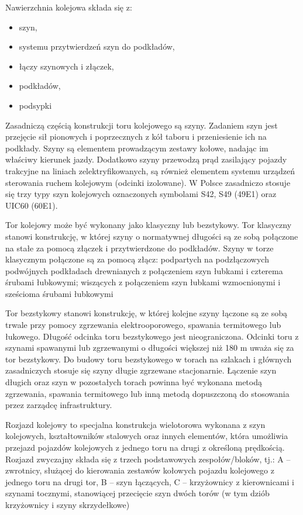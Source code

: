 Nawierzchnia kolejowa składa się z:
\begin{itemize}
\item szyn,
\item systemu przytwierdzeń szyn do podkładów,
\item łączy szynowych i złączek,
\item podkładów,
\item podsypki 
\end{itemize}


Zasadniczą częścią konstrukcji toru kolejowego są szyny. Zadaniem szyn jest przejęcie sił pionowych i poprzecznych z kół taboru i przeniesienie ich na podkłady. Szyny są elementem prowadzącym zestawy kołowe, nadając im właściwy kierunek jazdy. Dodatkowo szyny przewodzą prąd zasilający pojazdy trakcyjne na liniach zelektryfikowanych, są również elementem systemu urządzeń sterowania ruchem kolejowym (odcinki izolowane). W Polsce zasadniczo stosuje się trzy typy szyn kolejowych oznaczonych symbolami S42, S49 (49E1)
oraz UIC60 (60E1).

Tor kolejowy może być wykonany jako klasyczny lub bezstykowy. Tor klasyczny stanowi konstrukcję, w której szyny o normatywnej długości są ze sobą połączone na stałe za pomocą złączek i przytwierdzone do podkładów. Szyny w torze klasycznym połączone są za pomocą złącz:
podpartych na podzłączowych podwójnych podkładach drewnianych z połączeniem szyn łubkami i czterema śrubami łubkowymi;
wiszących z połączeniem szyn łubkami wzmocnionymi i sześcioma śrubami łubkowymi 

Tor bezstykowy stanowi konstrukcję, w której kolejne szyny łączone są ze sobą trwale przy pomocy zgrzewania elektrooporowego, spawania termitowego lub łukowego. Długość odcinka toru bezstykowego jest nieograniczona. Odcinki toru z szynami spawanymi lub zgrzewanymi o długości większej niż 180 m uważa się za tor bezstykowy. Do budowy toru bezstykowego w torach na szlakach i głównych zasadniczych stosuje się szyny długie zgrzewane stacjonarnie. Łączenie szyn długich oraz szyn w pozostałych torach powinna być wykonana metodą zgrzewania, spawania termitowego lub inną metodą dopuszczoną do stosowania przez zarządcę infrastruktury. 

Rozjazd kolejowy to specjalna konstrukcja wielotorowa wykonana z szyn kolejowych, kształtowników stalowych oraz innych elementów, która umożliwia przejazd pojazdów kolejowych z jednego toru na drugi z określoną prędkością.
Rozjazd zwyczajny składa się z trzech podstawowych zespołów/bloków, tj.:
A – zwrotnicy, służącej do kierowania zestawów kołowych pojazdu kolejowego
z jednego toru na drugi tor,
B – szyn łączących,
C – krzyżownicy z kierownicami i szynami tocznymi, stanowiącej przecięcie szyn dwóch torów (w tym dziób krzyżownicy i szyny skrzydełkowe)

